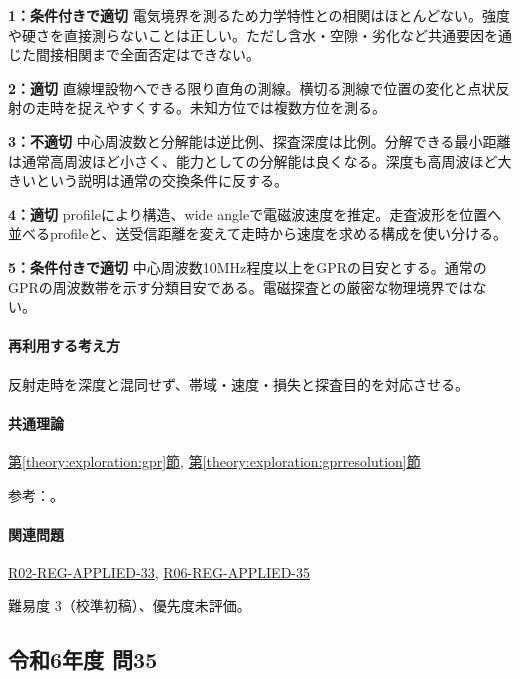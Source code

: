 \noindent\textbf{1：条件付きで適切} 電気境界を測るため力学特性との相関はほとんどない。強度や硬さを直接測らないことは正しい。ただし含水・空隙・劣化など共通要因を通じた間接相関まで全面否定はできない。\par

\noindent\textbf{2：適切} 直線埋設物へできる限り直角の測線。横切る測線で位置の変化と点状反射の走時を捉えやすくする。未知方位では複数方位を測る。\par

\noindent\textbf{3：不適切} 中心周波数と分解能は逆比例、探査深度は比例。分解できる最小距離は通常高周波ほど小さく、能力としての分解能は良くなる。深度も高周波ほど大きいという説明は通常の交換条件に反する。\par

\noindent\textbf{4：適切} profileにより構造、wide angleで電磁波速度を推定。走査波形を位置へ並べるprofileと、送受信距離を変えて走時から速度を求める構成を使い分ける。\par

\noindent\textbf{5：条件付きで適切} 中心周波数10MHz程度以上をGPRの目安とする。通常のGPRの周波数帯を示す分類目安である。電磁探査との厳密な物理境界ではない。\par

\paragraph{再利用する考え方} 反射走時を深度と混同せず、帯域・速度・損失と探査目的を対応させる。

\paragraph{共通理論} \hyperref[theory:exploration:gpr]{第\ref*{theory:exploration:gpr}節}, \hyperref[theory:exploration:gprresolution]{第\ref*{theory:exploration:gprresolution}節}

\par 参考：\cite{epa_gpr}。

\paragraph{関連問題} \hyperref[q:r02-reg-applied-33]{R02-REG-APPLIED-33}, \hyperref[q:r06-reg-applied-35]{R06-REG-APPLIED-35}

\par 難易度 3（校準初稿）、優先度未評価。

\subsection{令和6年度 問35}
\label{q:r06-reg-applied-35}

